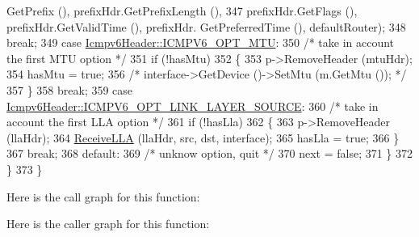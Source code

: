 \begin{DoxyCode}
      GetPrefix (), prefixHdr.GetPrefixLength (),
347                                           prefixHdr.GetFlags (), prefixHdr.GetValidTime (), prefixHdr.
      GetPreferredTime (), defaultRouter);
348           \textcolor{keywordflow}{break};
349         \textcolor{keywordflow}{case} \hyperlink{classns3_1_1Icmpv6Header_a1992e0e28c453f5e23b1ad55a49b7908a01736885b7e667e2ec3b76f9bae8b0cb}{Icmpv6Header::ICMPV6\_OPT\_MTU}:
350           \textcolor{comment}{/* take in account the first MTU option */}
351           \textcolor{keywordflow}{if} (!hasMtu)
352             \{
353               p->RemoveHeader (mtuHdr);
354               hasMtu = \textcolor{keyword}{true};
356               \textcolor{comment}{/* interface->GetDevice ()->SetMtu (m.GetMtu ()); */}
357             \}
358           \textcolor{keywordflow}{break};
359         \textcolor{keywordflow}{case} \hyperlink{classns3_1_1Icmpv6Header_a1992e0e28c453f5e23b1ad55a49b7908a07035de174ae9be5f6818c46eb299c48}{Icmpv6Header::ICMPV6\_OPT\_LINK\_LAYER\_SOURCE}:
360           \textcolor{comment}{/* take in account the first LLA option */}
361           \textcolor{keywordflow}{if} (!hasLla)
362             \{
363               p->RemoveHeader (llaHdr);
364               \hyperlink{classns3_1_1Icmpv6L4Protocol_ad6670739eba9c44ba37bf9644bfcdde5}{ReceiveLLA} (llaHdr, src, dst, interface);
365               hasLla = \textcolor{keyword}{true};
366             \}
367           \textcolor{keywordflow}{break};
368         \textcolor{keywordflow}{default}:
369           \textcolor{comment}{/* unknow option, quit */}
370           next = \textcolor{keyword}{false};
371         \}
372     \}
373 \}
\end{DoxyCode}


Here is the call graph for this function\+:




Here is the caller graph for this function\+:


